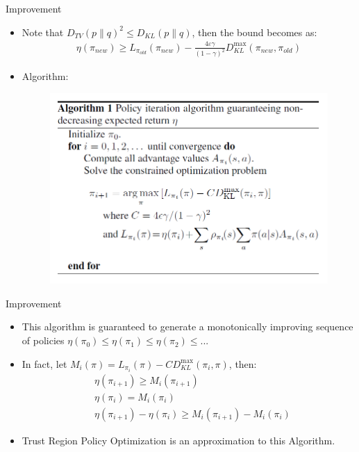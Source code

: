 \documentclass[mathserif]{beamer}
\begin{document}
\begin{frame}[t]{Improvement}
\begin{itemize}
  \item Note that $D_{TV}(p\parallel q)^{2}\le D_{KL}(p\parallel q)$, then the bound becomes as:
  \begin{align}
      \eta(\pi_{new})\ge L_{\pi_{old}}(\pi_{new})-\frac{4\varepsilon\gamma}{(1-\gamma)^{2}}D_{KL}^{\max}(\pi_{new},\pi_{old})
  \end{align}
  \item Algorithm:
  \begin{figure}
    \centering
    \includegraphics[scale=0.5]{fig/1}
  \end{figure}
\end{itemize}
\end{frame}

\begin{frame}[t]{Improvement}
\begin{itemize}
  \item This algorithm is guaranteed to generate a monotonically improving sequence of policies $\eta(\pi_{0})\le\eta(\pi_{1})\le\eta(\pi_{2})\le...$

  \item In fact, let $M_{i}(\pi)=L_{\pi_{i}}(\pi)-CD_{KL}^{\max}(\pi_{i},\pi)$, then:
  \begin{align}
    &\eta(\pi_{i+1})\ge M_{i}(\pi_{i+1})\\
    &\eta(\pi_{i})=M_{i}(\pi_{i})\\
    &\eta(\pi_{i+1})-\eta(\pi_{i})\ge M_{i}(\pi_{i+1})-M_{i}(\pi_{i})
  \end{align}

  \item Trust Region Policy Optimization is an approximation to this Algorithm.
\end{itemize}
\end{frame}
\end{document}
